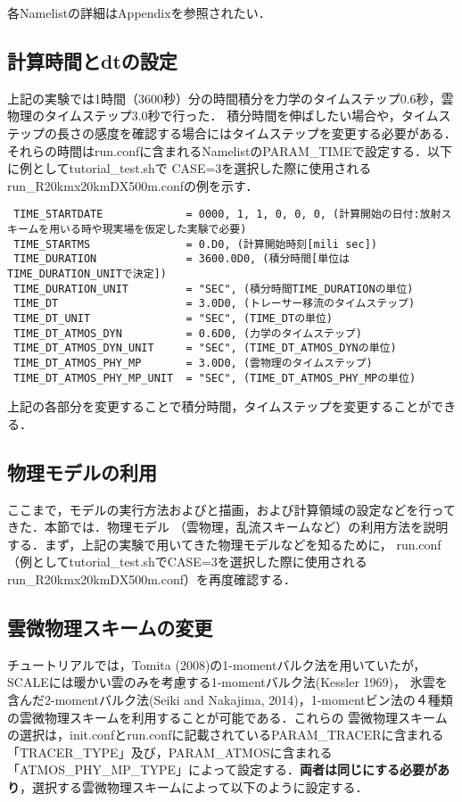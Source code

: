 各Namelistの詳細はAppendixを参照されたい．

\subsection{計算時間とdtの設定}
上記の実験では1時間（3600秒）分の時間積分を力学のタイムステップ0.6秒，雲物理のタイムステップ3.0秒で行った．
積分時間を伸ばしたい場合や，タイムステップの長さの感度を確認する場合にはタイムステップを変更する必要がある．
それらの時間はrun.confに含まれるNamelistのPARAM\_TIMEで設定する．以下に例としてtutorial\_test.shで
CASE=3を選択した際に使用されるrun\_R20kmx20kmDX500m.confの例を示す．

\begin{verbatim}
 TIME_STARTDATE             = 0000, 1, 1, 0, 0, 0, (計算開始の日付:放射スキームを用いる時や現実場を仮定した実験で必要)
 TIME_STARTMS               = 0.D0, (計算開始時刻[mili sec])
 TIME_DURATION              = 3600.0D0, (積分時間[単位はTIME_DURATION_UNITで決定])
 TIME_DURATION_UNIT         = "SEC", (積分時間TIME_DURATIONの単位)
 TIME_DT                    = 3.0D0, (トレーサー移流のタイムステップ)
 TIME_DT_UNIT               = "SEC", (TIME_DTの単位)
 TIME_DT_ATMOS_DYN          = 0.6D0, (力学のタイムステップ)
 TIME_DT_ATMOS_DYN_UNIT     = "SEC", (TIME_DT_ATMOS_DYNの単位)
 TIME_DT_ATMOS_PHY_MP       = 3.0D0, (雲物理のタイムステップ)
 TIME_DT_ATMOS_PHY_MP_UNIT  = "SEC", (TIME_DT_ATMOS_PHY_MPの単位)
\end{verbatim}

上記の各部分を変更することで積分時間，タイムステップを変更することができる．

\subsection{物理モデルの利用}
ここまで，モデルの実行方法およびと描画，および計算領域の設定などを行ってきた．本節では．物理モデル
（雲物理，乱流スキームなど）の利用方法を説明する．まず，上記の実験で用いてきた物理モデルなどを知るために，
run.conf（例としてtutorial\_test.shでCASE=3を選択した際に使用されるrun\_R20kmx20kmDX500m.conf）を再度確認する．


\subsection{雲微物理スキームの変更}
チュートリアルでは，Tomita (2008)の1-momentバルク法を用いていたが，SCALEには暖かい雲のみを考慮する1-momentバルク法(Kessler 1969)，
氷雲を含んだ2-momentバルク法(Seiki and Nakajima, 2014)，1-momentビン法の４種類の雲微物理スキームを利用することが可能である．これらの
雲微物理スキームの選択は，init.confとrun.confに記載されているPARAM\_TRACERに含まれる「TRACER\_TYPE」及び，PARAM\_ATMOSに含まれる
「ATMOS\_PHY\_MP\_TYPE」によって設定する．{\bf 両者は同じにする必要があり}，選択する雲微物理スキームによって以下のように設定する．

